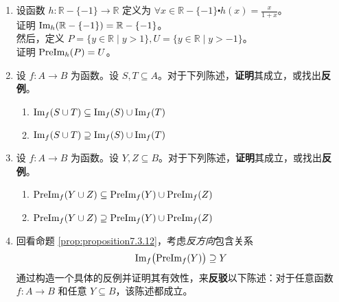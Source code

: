 \begin{enumerate}[label=(\arabic*)]
    \item 设函数 $h : \mathbb{R} - \{-1\} \to \mathbb{R}$ 定义为 $\forall x \in \mathbb{R} - \{-1\} \centerdot h(x) = \frac{x}{1+x}$。\\
        证明 $\text{Im}_h(\mathbb{R} - \{-1\}) = \mathbb{R} - \{-1\}$。\\
        然后，定义 $P = \{y \in \mathbb{R} \mid y > 1\}, U = \{y \in \mathbb{R} \mid y > -1\}$。 \\
        证明 $\text{PreIm}_h(P) = U$。
    \item 设 $f:A \to B$ 为函数。设 $S,T \subseteq A$。对于下列陈述，\textbf{证明}其成立，或找出\textbf{反例}。
        \begin{enumerate}[label=(\alph*)]
            \item $\text{Im}_f (S \cup T) \subseteq \text{Im}_f (S) \cup \text{Im}_f (T)$
            \item $\text{Im}_f (S \cup T) \supseteq \text{Im}_f (S) \cup \text{Im}_f (T)$
        \end{enumerate}
    \item 设 $f:A \to B$ 为函数。设 $Y,Z \subseteq B$。对于下列陈述，\textbf{证明}其成立，或找出\textbf{反例}。
        \begin{enumerate}[label=(\alph*)]
            \item $\text{PreIm}_f (Y \cup Z) \subseteq \text{PreIm}_f (Y) \cup \text{PreIm}_f (Z)$
            \item $\text{PreIm}_f (Y \cup Z) \supseteq \text{PreIm}_f (Y) \cup \text{PreIm}_f (Z)$
        \end{enumerate}
    \item 回看命题 \ref{prop:proposition7.3.12}，考虑\emph{反方向}包含关系
        \[\text{Im}_f \big(\text{PreIm}_f (Y)\big) \supseteq Y\]
        通过构造一个具体的反例并证明其有效性，来\textbf{反驳}以下陈述：对于任意函数 $f : A \to B$ 和任意 $Y \subseteq B$，该陈述都成立。
\end{enumerate}